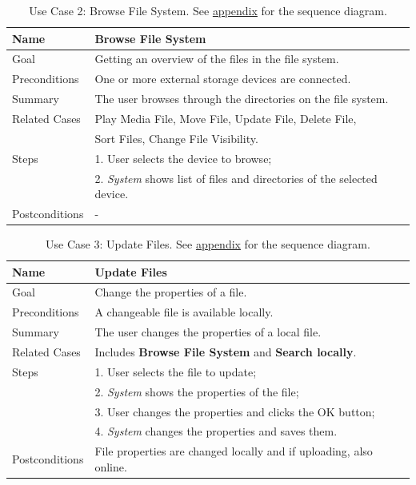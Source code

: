 \begin{table}[h!]
\centering
\begin{tabular}{|l|l|}
\hline
Name & Browse File System\\ \hline
Goal & Getting an overview of the files in the file system.\\ \hline
Preconditions & One or more external storage devices are connected. \\ \hline
Summary & The user browses through the directories on the file system.\\ \hline
Related Cases & Play Media File, Move File, Update File, Delete File, \\ 
              &  Sort Files, Change File Visibility. \\ \hline
Steps &  1. User selects the device to browse; \\
      &  2. \textit{System} shows list of files and directories of the selected device. 
        \\ \hline
Postconditions & -
\\ \hline
\end{tabular}
\caption{Use Case 2: Browse File System. See \hyperref[fig:req_seq2]{appendix} for the sequence diagram.}
\label{tab:UC2}
\end{table}

\begin{table}[h!]
\centering
\begin{tabular}{|l|l|}
\hline
Name & Update Files\\ \hline
Goal & Change the properties of a file.\\ \hline
Preconditions & A changeable file is available locally. \\ \hline
Summary & The user changes the properties of a local file.\\ \hline
Related Cases & Includes \textbf{Browse File System} and \textbf{Search locally}. \\ \hline
Steps &  1. User selects the file to update; \\
      &  2. \textit{System} shows the properties of the file; \\ 
      &  3. User changes the properties and clicks the OK button; \\
      &  4. \textit{System} changes the properties and saves them. 
        \\ \hline
Postconditions & File properties are changed locally and if uploading, also online.
\\ \hline
\end{tabular}
\caption{Use Case 3: Update Files. See \hyperref[fig:req_seq2]{appendix} for the sequence diagram.}
\label{tab:UC3}
\end{table}

